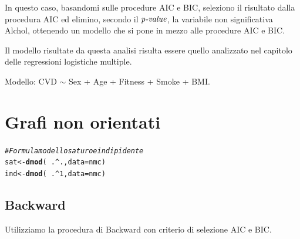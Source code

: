 \documentclass{article}\usepackage[]{graphicx}\usepackage[]{xcolor}
\makeatletter
\newcommand{\hlnum}[1]{\textcolor[rgb]{0.686,0.059,0.569}{#1}}%
\newcommand{\hlcom}[1]{\textcolor[rgb]{0.678,0.584,0.686}{\textit{#1}}}%
\newcommand{\hlopt}[1]{\textcolor[rgb]{0,0,0}{#1}}%
\newcommand{\hlstd}[1]{\textcolor[rgb]{0.345,0.345,0.345}{#1}}%
\newcommand{\hlkwb}[1]{\textcolor[rgb]{0.69,0.353,0.396}{#1}}%
\newcommand{\hlkwc}[1]{\textcolor[rgb]{0.333,0.667,0.333}{#1}}%
\newcommand{\hlkwd}[1]{\textcolor[rgb]{0.737,0.353,0.396}{\textbf{#1}}}%
\newenvironment{kframe}{%
 \def\at@end@of@kframe{}%
 \ifinner\ifhmode%
  \def\at@end@of@kframe{\end{minipage}}%
  \begin{minipage}{\columnwidth}%
 \fi\fi%
 \def\FrameCommand##1{\hskip\@totalleftmargin \hskip-\fboxsep
 \colorbox{shadecolor}{##1}\hskip-\fboxsep
     \hskip-\linewidth \hskip-\@totalleftmargin \hskip\columnwidth}%
 \MakeFramed {\advance\hsize-\width
   \@totalleftmargin\z@ \linewidth\hsize
   \@setminipage}}%
 {\par\unskip\endMakeFramed%
 \at@end@of@kframe}
\newenvironment{knitrout}{}{} %
\makeatother
\begin{document}
      In questo caso, basandomi sulle procedure AIC e BIC, 
      seleziono il risultato dalla procedura AIC ed elimino, secondo il
      $\emph{p-value}$, la variabile non significativa Alchol, ottenendo un modello
      che si pone in mezzo alle procedure AIC e BIC. \par
      Il modello risultate da questa analisi risulta essere quello analizzato
      nel capitolo delle regressioni logistiche multiple. \par
      Modello: CVD $\sim$ Sex + Age + Fitness + Smoke + BMI. \par

\clearpage




\section{Grafi non orientati}
\begin{knitrout}
\color{fgcolor}\begin{kframe}
\begin{alltt}
\hlcom{#Formula modello saturo e indipidente}
\hlstd{sat} \hlkwb{<-} \hlkwd{dmod}\hlstd{(}\hlopt{~}\hlstd{.}\hlopt{^}\hlstd{.,} \hlkwc{data}\hlstd{=nmc)}
\hlstd{ind} \hlkwb{<-} \hlkwd{dmod}\hlstd{(}\hlopt{~}\hlstd{.}\hlopt{^}\hlnum{1}\hlstd{,} \hlkwc{data}\hlstd{=nmc)}
\end{alltt}
\end{kframe}
\end{knitrout}
  
  \subsection{Backward}
    Utilizziamo la procedura di Backward con criterio di selezione AIC e BIC.
  
\end{document}
